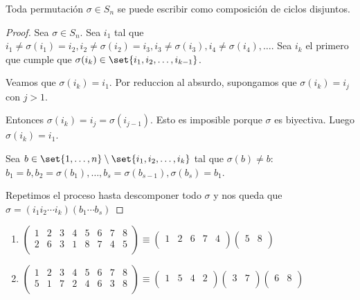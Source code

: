 \begin{proposition}
	Toda permutación \(\sigma \in S_n \) se puede escribir como composición de ciclos disjuntos.
\end{proposition}
\begin{proof}
	Sea \(\sigma \in S_n \). Sea \(i_1 \) tal que \(i_1 \neq \sigma(i_1 ) = i_2, i_2 \neq \sigma(i_2) = i_3, i_3 \neq \sigma(i_3), i_4 \neq \sigma(i_4),\ldots\). Sea \(i_k \) el primero que cumple que \(\sigma(i_k) \in \set{i_1,i_2,\ldots,i_{k-1}} \).
	
	Veamos que \(\sigma(i_k) = i_1 \). Por reduccion al absurdo, supongamos que \(\sigma(i_k) = i_j \) con \(j > 1 \).
	
	Entonces \(\sigma(i_k) = i_j = \sigma(i_{j-1})\). Esto es imposible porque \(\sigma\) es biyectiva. Luego \(\sigma(i_k) = i_1 \).
	
	Sea \(b \in \set{1,\ldots,n} \setminus \set{i_1, i_2, \ldots, i_k} \) tal que \(\sigma(b) \neq  b\): \(b_1 = b, b_2 = \sigma(b_1), \ldots, b_s = \sigma(b_{s-1}), \sigma(b_s) = b_1 \).
	
	Repetimos el proceso hasta descomponer todo \(\sigma\) y nos queda que \(\sigma = (i_{1} i_2 \cdots i_k)(b_1 \cdots b_s)\)
\end{proof}
\begin{example}
	\begin{enumerate}
		\item \(\begin{pmatrix}
			      1 & 2 & 3 & 4 & 5 & 6 & 7 & 8 \\
			      2 & 6 & 3 & 1 & 8 & 7 & 4 & 5 \\
		      \end{pmatrix} \equiv \begin{pmatrix}
			      1 & 2 & 6 & 7 & 4 \\
		      \end{pmatrix} \begin{pmatrix}
			      5 & 8 \\
		      \end{pmatrix}\)
		\item \(\begin{pmatrix}
			      1 & 2 & 3 & 4 & 5 & 6 & 7 & 8 \\
			      5 & 1 & 7 & 2 & 4 & 6 & 3 & 8 \\
		      \end{pmatrix} \equiv \begin{pmatrix}
			      1 & 5 & 4 & 2 \\
		      \end{pmatrix}\begin{pmatrix}
			      3 & 7 \\
		      \end{pmatrix}\begin{pmatrix}
			      6 & 8 \\
		      \end{pmatrix}\)
	\end{enumerate}
\end{example}
